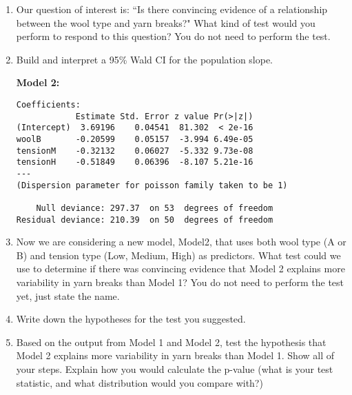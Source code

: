 \documentclass[11pt]{article}
\begin{document}
\begin{enumerate}

\item Our question of interest is: ``Is there convincing evidence of a relationship between the wool type and yarn breaks?" What kind of test would you perform to respond to this question? You do not need to perform the test. 

\vspace{3cm}

\item Build and interpret a 95\% Wald CI for the population slope. 


\vspace{6cm} 


\pagebreak

\textbf{Model 2:} 
{
\begin{verbatim}
Coefficients:
            Estimate Std. Error z value Pr(>|z|)    
(Intercept)  3.69196    0.04541  81.302  < 2e-16 
woolB       -0.20599    0.05157  -3.994 6.49e-05 
tensionM    -0.32132    0.06027  -5.332 9.73e-08 
tensionH    -0.51849    0.06396  -8.107 5.21e-16 
---
(Dispersion parameter for poisson family taken to be 1)

    Null deviance: 297.37  on 53  degrees of freedom
Residual deviance: 210.39  on 50  degrees of freedom
\end{verbatim}
}


\item Now we are considering a new model, Model2, that uses both wool type (A or B) and tension type (Low, Medium, High) as predictors. What test could we use to determine if there was convincing evidence that Model 2 explains more variability in yarn breaks than Model 1? You do not need to perform the test yet, just state the name. 

\vspace{3cm}


\item Write down the hypotheses for the test you suggested. 

\vspace{4cm}

\item Based on the output from Model 1 and Model 2, test the hypothesis that Model 2 explains more variability in yarn breaks than Model 1. Show all of your steps. Explain how you would calculate the p-value (what is your test statistic, and what distribution would you compare with?)


\end{enumerate}
\end{document}
